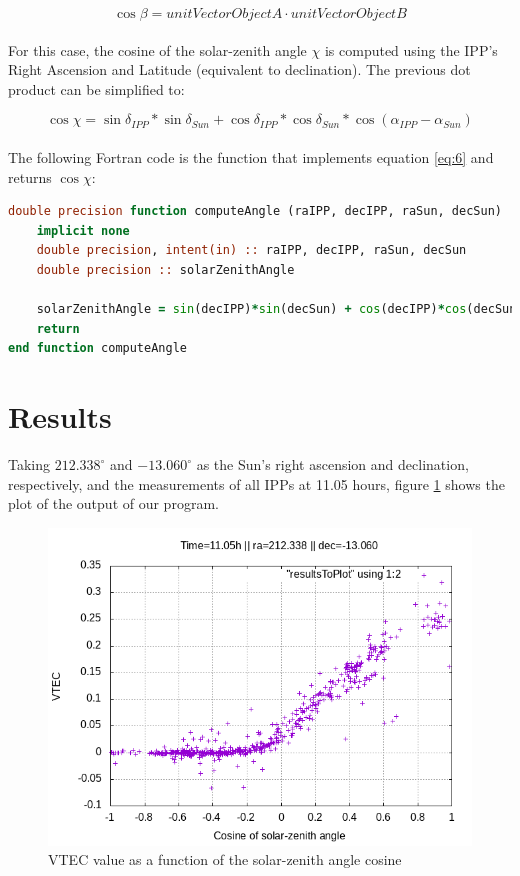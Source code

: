 \begin{equation} \label{eq:5}
\cos \beta = unitVectorObjectA \cdot unitVectorObjectB
\end{equation}\\

For this case, the cosine of the solar-zenith angle $\chi$ is computed using the IPP's Right Ascension and Latitude (equivalent to declination). The previous dot product can be simplified to:

\begin{equation} \label{eq:6}
\cos \chi = \sin\delta_{IPP}*\sin\delta_{Sun} + \cos\delta_{IPP}*\cos\delta_{Sun}*\cos(\alpha_{IPP} - \alpha_{Sun})
\end{equation}\\

The following Fortran code is the function that implements equation \ref{eq:6} and returns $\cos \chi$:

\begin{minipage}{\linewidth}
\begin{lstlisting}[language=Fortran, caption=Computation of the solar-zenith a angle's cosine]
double precision function computeAngle (raIPP, decIPP, raSun, decSun)
	implicit none
	double precision, intent(in) :: raIPP, decIPP, raSun, decSun
	double precision :: solarZenithAngle
	
	solarZenithAngle = sin(decIPP)*sin(decSun) + cos(decIPP)*cos(decSun)*cos(raIPP - raSun)
	return
end function computeAngle
\end{lstlisting}
\end{minipage}

\section{Results}

Taking $212.338^{\circ}$ and $-13.060^{\circ}$ as the Sun's right ascension and declination, respectively, and the measurements of all IPPs at 11.05 hours, figure \ref{fig:results} shows the plot of the output of our program.

\begin{figure}[!htb]
\begin{centering}
	\includegraphics[width=0.5\linewidth]{images/ch4/resultSunTest.png}
	\caption{VTEC value as a function of the solar-zenith angle cosine}
	\label{fig:results}
\end{centering}
\end{figure}


